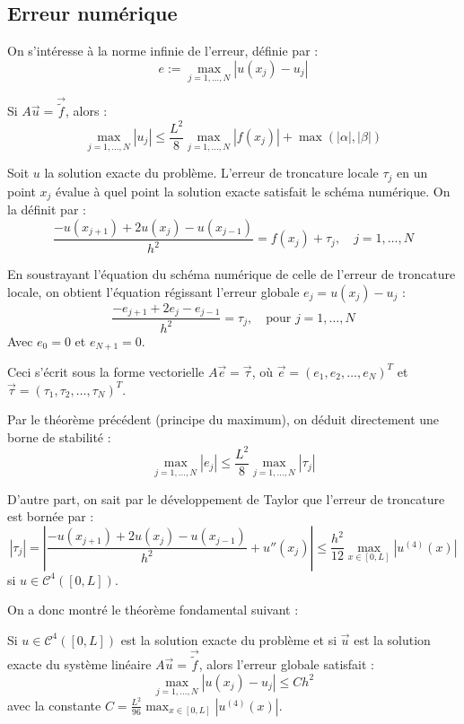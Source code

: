 \subsection{Erreur numérique}

On s'intéresse à la norme infinie de l'erreur, définie par :
$$e := \max_{j=1, \dots, N} |u(x_j) - u_j|$$

\begin{theoreme}
Si $A\vec{u} = \vec{\tilde{f}}$, alors :
$$\max_{j=1, \dots, N} |u_j| \le \frac{L^2}{8} \max_{j=1, \dots, N} |f(x_j)| + \max(|\alpha|, |\beta|)$$
\end{theoreme}

\begin{definition}
Soit $u$ la solution exacte du problème. L'erreur de troncature locale $\tau_j$ en un point $x_j$ évalue à quel point la solution exacte satisfait le schéma numérique. On la définit par :
$$\frac{-u(x_{j+1}) + 2u(x_j) - u(x_{j-1})}{h^2} = f(x_j) + \tau_j, \quad j=1, \dots, N$$
\end{definition}

En soustrayant l'équation du schéma numérique de celle de l'erreur de troncature locale, on obtient l'équation régissant l'erreur globale $e_j = u(x_j) - u_j$ :
$$\frac{-e_{j+1} + 2e_j - e_{j-1}}{h^2} = \tau_j, \quad \text{pour } j=1, \dots, N$$
Avec $e_0 = 0$ et $e_{N+1} = 0$.

Ceci s'écrit sous la forme vectorielle $A\vec{e} = \vec{\tau}$, où $\vec{e} = (e_1, e_2, \dots, e_N)^T$ et $\vec{\tau} = (\tau_1, \tau_2, \dots, \tau_N)^T$.

Par le théorème précédent (principe du maximum), on déduit directement une borne de stabilité :
$$\max_{j=1, \dots, N} |e_j| \le \frac{L^2}{8} \max_{j=1, \dots, N} |\tau_j|$$

D'autre part, on sait par le développement de Taylor que l'erreur de troncature est bornée par :
$$|\tau_j| = \left| \frac{-u(x_{j+1}) + 2u(x_j) - u(x_{j-1})}{h^2} + u''(x_j) \right| \le \frac{h^2}{12} \max_{x \in [0,L]} |u^{(4)}(x)|$$
si $u \in \mathcal{C}^4([0,L])$.

On a donc montré le théorème fondamental suivant :
\begin{theoreme}
Si $u \in \mathcal{C}^4([0,L])$ est la solution exacte du problème et si $\vec{u}$ est la solution exacte du système linéaire $A\vec{u} = \vec{\tilde{f}}$, alors l'erreur globale satisfait :
$$\max_{j=1, \dots, N} |u(x_j) - u_j| \le C h^2$$
avec la constante $C = \frac{L^2}{96} \max_{x \in [0,L]} |u^{(4)}(x)|$.
\end{theoreme}

